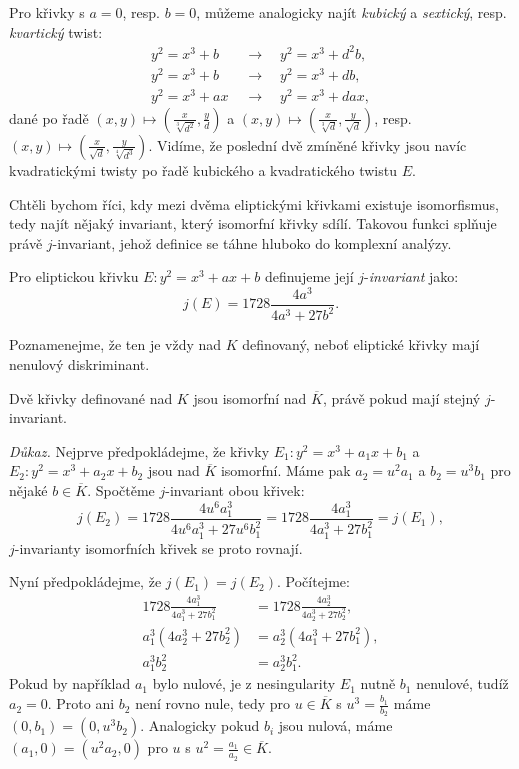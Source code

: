 \documentclass[12pt]{report}
\begin{document}
Pro křivky s $a=0$, resp. $b=0$, můžeme analogicky najít \textit{kubický} a \textit{sextický}, resp. \textit{kvartický} twist:
\begin{align*}
y^2 = x^3 + b \quad &\longrightarrow \quad y^2 = x^3 + d^2 b ,\\
y^2 = x^3 + b \quad &\longrightarrow \quad y^2 = x^3 + d b, \\
y^2 = x^3 +ax \; &\longrightarrow \quad y^2 = x^3 + d ax ,
\end{align*}
dané po řadě $(x,y)  \mapsto \left(\frac{x}{\sqrt[3]{d^2}}, \frac{y}{d}\right)$ a $(x,y)  \mapsto \left(\frac{x}{\sqrt[3]{d}}, \frac{y}{\sqrt{d}}\right)$, resp. $(x,y)  \mapsto \left(\frac{x}{\sqrt{d}}, \frac{y}{\sqrt[4]{d^3}}\right)$. Vidíme, že poslední dvě zmíněné křivky jsou navíc kvadratickými twisty po řadě kubického a kvadratického twistu $E$.

Chtěli bychom říci, kdy mezi dvěma eliptickými křivkami existuje isomorfismus, tedy najít nějaký invariant, který isomorfní křivky sdílí. Takovou funkci splňuje právě $j$-invariant, jehož definice se táhne hluboko do komplexní analýzy.

\begin{definice}
Pro eliptickou křivku $E: y^2 = x^3 + ax + b$ definujeme její $j$-\textit{invariant} jako:
\begin{equation*}
j(E) = 1728 \frac{4a^3}{4a^3+27b^2}.
\end{equation*}
\end{definice}
Poznamenejme, že ten je vždy nad $K$ definovaný, neboť eliptické křivky mají nenulový diskriminant.
\begin{veta}
Dvě křivky definované nad $K$ jsou isomorfní nad $\overline{K}$, právě pokud mají stejný $j$-invariant.
\end{veta}

\noindent \textit{Důkaz. } Nejprve předpokládejme, že křivky $E_1: y^2 = x^3+a_1x+b_1$ a $E_2 : y^2 = x^3+a_2 x + b_2$ jsou nad $\overline{K}$ isomorfní. Máme pak $a_2 = u^2 a_1$ a $b_2 = u^3 b_1$ pro nějaké $b \in \overline{K}$. Spočtěme $j$-invariant obou křivek:
\begin{equation*}
j(E_2) = 1728 \frac{4 u^6 a_1^3}{4 u^6 a_1^3 + 27 u^6 b_1^2} = 1728 \frac{4 a_1^3}{4a_1^3 + 27 b_1^2} = j(E_1),
\end{equation*}
$j$-invarianty isomorfních křivek se proto rovnají.

Nyní předpokládejme, že $j(E_1) = j(E_2)$. Počítejme:
\begin{align*}
1728 \frac{4 a_1^3}{4 a_1^3 + 27 b_1^2} &= 1728 \frac{4 a_2^3}{4a_2^3 + 27 b_2^2},\\
a_1^3 (4 a_2^3 + 27b_2^2) &= a_2^3 (4a_1 ^3 + 27 b_1^2),\\
a_1^3 b_2^2 &= a_2^3 b_1^2.
\end{align*}
Pokud by například $a_1$ bylo nulové, je z nesingularity $E_1$ nutně $b_1$ nenulové, tudíž $a_2 = 0$. Proto ani $b_2$ není rovno nule, tedy pro $u \in \overline{K}$ s $u^3 = \frac{b_1}{b_2}$ máme $(0,b_1) = (0,u^3 b_2)$. Analogicky pokud $b_i$ jsou nulová, máme $(a_1,0) = (u^2 a_2,0)$ pro $u$ s $u^2  = \frac{a_1}{a_2} \in \overline{K}$.
\end{document}
